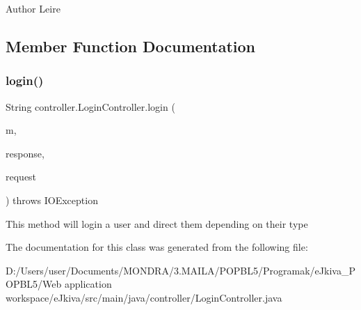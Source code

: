 \begin{DoxyAuthor}{Author}
Leire 
\end{DoxyAuthor}


\subsection{Member Function Documentation}
\mbox{\label{classcontroller_1_1_login_controller_a9fd62e375ad30b0553200ad40d859cbc}} 
\subsubsection{\texorpdfstring{login()}{login()}}
{\footnotesize\ttfamily String controller.\+Login\+Controller.\+login (\begin{DoxyParamCaption}\item[{Model}]{m,  }\item[{Http\+Servlet\+Response}]{response,  }\item[{Http\+Servlet\+Request}]{request }\end{DoxyParamCaption}) throws I\+O\+Exception\hspace{0.3cm}{\ttfamily [inline]}}

This method will login a user and direct them depending on their type 

The documentation for this class was generated from the following file\+:\begin{DoxyCompactItemize}
\item 
D\+:/\+Users/user/\+Documents/\+M\+O\+N\+D\+R\+A/3.\+M\+A\+I\+L\+A/\+P\+O\+P\+B\+L5/\+Programak/e\+Jkiva\+\_\+\+P\+O\+P\+B\+L5/\+Web application workspace/e\+Jkiva/src/main/java/controller/Login\+Controller.\+java\end{DoxyCompactItemize}
